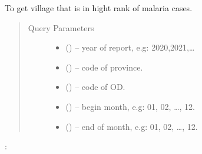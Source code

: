 \documentclass[letterpaper,10pt,english,openany,oneside]{sphinxmanual}
\begin{document}
\begin{fulllineitems}
\label{\detokenize{api-cmi/v1:get--api-malaria-info-v1-Surveillance-malaria_hotspot}}
\sphinxAtStartPar
To get village that is in hight rank of malaria cases.
\begin{quote}\begin{description}
\item[{Query Parameters}] \leavevmode\begin{itemize}
\item {} 
\sphinxAtStartPar
{} () – year of report, e.g: 2020,2021,…

\item {} 
\sphinxAtStartPar
{} () – code of province.

\item {} 
\sphinxAtStartPar
{} () – code of OD.

\item {} 
\sphinxAtStartPar
{} () – begin month, e.g: 01, 02, …, 12.

\item {} 
\sphinxAtStartPar
{} () – end of month, e.g: 01, 02, …, 12.

\end{itemize}

\end{description}\end{quote}

\sphinxAtStartPar
{}:


\end{fulllineitems}
\end{document}
